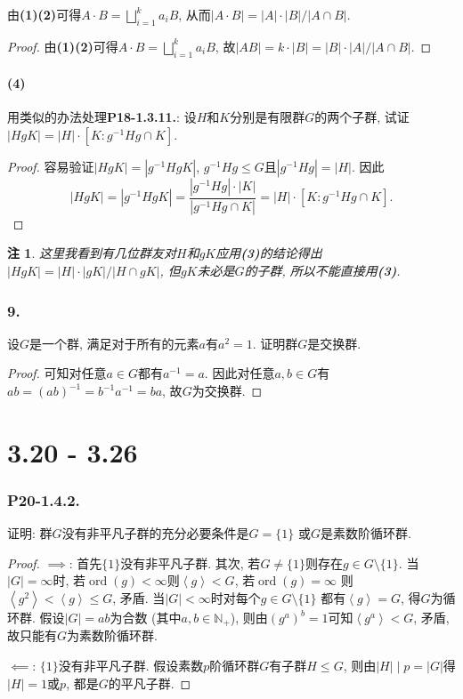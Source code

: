 \documentclass[12pt, a4paper, fontset=windows]{ctexart}
\newcommand{\N}{\mathbb{N}}
\newcommand{\abs}[1]{\left|{#1}\right|}
\newcommand{\gen}[1]{\left\langle{#1}\right\rangle}
\newcommand{\ord}{\operatorname{ord}}
\newtheorem*{remark}{注}
\begin{document}
由{\bf (1)(2)}可得$A\cdot B=\bigsqcup^k_{i=1}a_iB$, 
从而$\abs{A\cdot B}=\abs{A}\cdot\abs{B}/\abs{A\cap B}$. 

\begin{proof}
由{\bf (1)(2)}可得$A\cdot B=\bigsqcup^k_{i=1}a_iB$, 故$\abs{AB}=k\cdot\abs{B}=\abs{B}\cdot\abs{A}/\abs{A\cap B}$. 
\end{proof}

\subsection*{(4)}

用类似的办法处理{\bf P18-1.3.11.}: 设$H$和$K$分别是有限群$G$的两个子群, 
试证$\abs{HgK}=\abs{H}\cdot[K:g^{-1}Hg\cap K]$. 

\begin{proof}
容易验证$\abs{HgK}=\abs{g^{-1}HgK}$, $g^{-1}Hg\le G$且$\abs{g^{-1}Hg}=\abs{H}$. 
因此\[\abs{HgK}=\abs{g^{-1}HgK}=\frac{\abs{g^{-1}Hg}\cdot\abs{K}}{\abs{g^{-1}Hg\cap K}}=\abs{H}\cdot[K:g^{-1}Hg\cap K].\]
\end{proof}

\begin{remark}
这里我看到有几位群友对$H$和$gK$应用{\bf (3)}的结论得出
$\abs{HgK}=\abs{H}\cdot\abs{gK}/\abs{H\cap gK}$, 
但$gK$未必是$G$的子群, 所以不能直接用{\bf (3)}. 
\end{remark}

\section*{9.}

设$G$是一个群, 满足对于所有的元素$a$有$a^2=1$. 
证明群$G$是交换群. 

\begin{proof}
可知对任意$a\in G$都有$a^{-1}=a$. 因此对任意$a,b\in G$有
$ab=(ab)^{-1}=b^{-1}a^{-1}=ba$, 故$G$为交换群. 
\end{proof}

\clearpage
\part{3.20 - 3.26}

\section*{P20-1.4.2.}

证明: 群$G$没有非平凡子群的充分必要条件是$G=\{1\}$
或$G$是素数阶循环群. 

\begin{proof}
$\implies$: 
首先$\{1\}$没有非平凡子群. 其次, 若$G\ne\{1\}$则存在$g\in G\setminus\{1\}$. 
当$\abs{G}=\infty$时, 若$\ord(g)<\infty$则$\gen{g}<G$, 若$\ord(g)=\infty$
则$\gen{g^2}<\gen{g}\le G$, 矛盾. 当$\abs{G}<\infty$时对每个$g\in G\setminus\{1\}$
都有$\gen{g}=G$, 得$G$为循环群. 假设$\abs{G}=ab$为合数 (其中$a,b\in\N_+$), 
则由$(g^a)^b=1$可知$\gen{g^a}<G$, 矛盾, 故只能有$G$为素数阶循环群. 

$\impliedby$: 
$\{1\}$没有非平凡子群. 假设素数$p$阶循环群$G$有子群$H\le G$, 
则由$\abs{H}\mid p=\abs{G}$得$\abs{H}=1$或$p$, 都是$G$的平凡子群. 
\end{proof}
\end{document}
